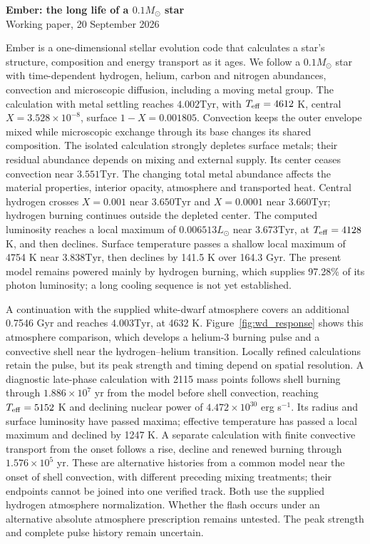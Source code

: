 \documentclass[11pt,letterpaper]{article}
\newcommand{\Ms}{M_\odot}\newcommand{\Rs}{R_\odot}\newcommand{\Ls}{L_\odot}
\newcommand{\Tyr}{\mathrm{Tyr}}
\begin{document}
\begin{center}
{\Large\bfseries Ember: the long life of a $0.1\Ms$ star}\\[8pt]
{\small Working paper, 20 September 2026}
\end{center}

Ember is a one-dimensional stellar evolution code that calculates a star's
structure, composition and energy transport as it ages.
We follow a $0.1\Ms$ star with time-dependent hydrogen, helium, carbon and
nitrogen abundances, convection and microscopic diffusion, including a moving
metal group. The calculation with metal settling reaches $4.002\Tyr$,
with $T_{\rm eff}=4612$ K, central $X=3.528\times10^{-8}$,
surface $1-X=0.001805$. Convection keeps the outer envelope mixed while
microscopic exchange through its base changes its shared composition.
The isolated calculation strongly depletes surface metals; their residual
abundance depends on mixing and external supply.
Its center ceases convection near $3.551\Tyr$. The changing total metal abundance affects the material
properties, interior opacity, atmosphere and transported heat. Central hydrogen crosses $X=0.001$
near $3.650\Tyr$ and $X=0.0001$ near $3.660\Tyr$; hydrogen burning
continues outside the depleted center. The computed luminosity reaches a
local maximum of $0.006513\Ls$ near $3.673\Tyr$, at $T_{\rm eff}=4128$ K,
and then declines. Surface temperature passes a shallow local maximum of 4754 K
near $3.838\Tyr$, then declines by 141.5 K
over 164.3 Gyr. The present model remains powered mainly by
hydrogen burning, which supplies 97.28\% of its photon luminosity; a long cooling sequence is not yet established.

A continuation with the supplied white-dwarf atmosphere covers an additional
0.7546 Gyr and reaches $4.003\Tyr$, at 4632 K.
Figure~\ref{fig:wd_response} shows this atmosphere comparison, which develops
a helium-3 burning pulse and a convective shell near the hydrogen--helium
transition. Locally refined calculations retain the pulse, but its peak
strength and timing depend on spatial resolution. A diagnostic late-phase
calculation with 2115 mass points follows shell burning through
$1.886\times10^7$ yr from the model before shell convection, reaching
$T_{\rm eff}=5152$ K and declining nuclear power of
$4.472\times10^{30}$ erg s$^{-1}$. Its radius and surface luminosity have passed maxima; effective temperature has passed a local maximum and declined by 1247 K. A separate calculation with finite
convective transport from the onset follows a rise, decline and renewed
burning through $1.576\times10^5$ yr. These are alternative histories from a
common model near the onset of shell convection, with different preceding
mixing treatments; their endpoints cannot be joined into one verified track.
Both use the supplied hydrogen atmosphere normalization. Whether the flash
occurs under an alternative absolute atmosphere prescription remains untested.
The peak strength and complete pulse history
remain uncertain.
\end{document}
